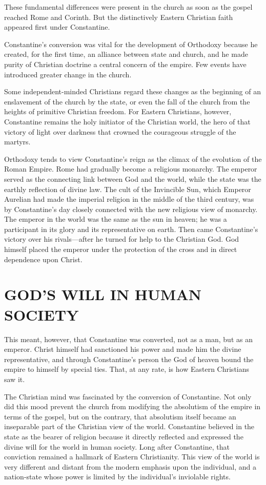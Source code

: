 These fundamental differences were present in the church as soon as the gospel reached Rome and
Corinth. But the distinctively Eastern Christian faith appeared first under Constantine.

Constantine’s conversion was vital for the development of Orthodoxy because he created, for the
first time, an alliance between state and church, and he made purity of Christian doctrine a central
concern of the empire. Few events have introduced greater change in the church.

Some independent-minded Christians regard these changes as the beginning of an enslavement of the
church by the state, or even the fall of the church from the heights of primitive Christian freedom.
For Eastern Christians, however, Constantine remains the holy initiator of the Christian world, the
hero of that victory of light over darkness that crowned the courageous struggle of the martyrs.

Orthodoxy tends to view Constantine’s reign as the climax of the evolution of the Roman Empire. Rome
had gradually become a religious monarchy. The emperor served as the connecting link between God and
the world, while the state was the earthly reflection of divine law. The cult of the Invincible Sun,
which Emperor Aurelian had made the imperial religion in the middle of the third century, was by
Constantine’s day closely connected with the new religious view of monarchy. The emperor in the
world was the same as the sun in heaven; he was a participant in its glory and its representative on
earth. Then came Constantine’s victory over his rivals—after he turned for help to the Christian
God. God himself placed the emperor under the protection of the cross and in direct dependence upon
Christ.

\section{GOD’S WILL IN HUMAN SOCIETY}

This meant, however, that Constantine was converted, not as a man, but as an emperor. Christ himself
had sanctioned his power and made him the divine representative, and through Constantine’s person
the God of heaven bound the empire to himself by special ties. That, at any rate, is how Eastern
Christians saw it.

The Christian mind was fascinated by the conversion of Constantine. Not only did this mood prevent
the church from modifying the absolutism of the empire in terms of the gospel, but on the contrary,
that absolutism itself became an inseparable part of the Christian view of the world. Constantine
believed in the state as the bearer of religion because it directly reflected and expressed the
divine will for the world in human society. Long after Constantine, that conviction remained a
hallmark of Eastern Christianity. This view of the world is very different and distant from the
modern emphasis upon the individual, and a nation-state whose power is limited by the individual’s
inviolable rights.


